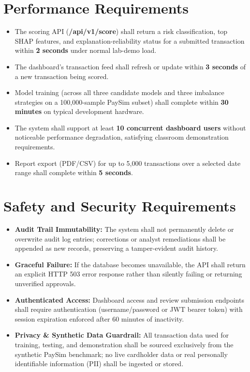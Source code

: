 \documentclass[12pt, a4paper]{report}
\begin{document}
\section{Performance Requirements}
\begin{itemize}
    \item[\textbf{NFR-1}] The scoring API (\textbf{/api/v1/score}) shall return a risk classification, top SHAP features, and explanation-reliability status for a submitted transaction within \textbf{2 seconds} under normal lab-demo load.
    \item[\textbf{NFR-2}] The dashboard's transaction feed shall refresh or update within \textbf{3 seconds} of a new transaction being scored.
    \item[\textbf{NFR-3}] Model training (across all three candidate models and three imbalance strategies on a 100,000-sample PaySim subset) shall complete within \textbf{30 minutes} on typical development hardware.
    \item[\textbf{NFR-4}] The system shall support at least \textbf{10 concurrent dashboard users} without noticeable performance degradation, satisfying classroom demonstration requirements.
    \item[\textbf{NFR-5}] Report export (PDF/CSV) for up to 5,000 transactions over a selected date range shall complete within \textbf{5 seconds}.
\end{itemize}

\section{Safety and Security Requirements}
\begin{itemize}
    \item[\textbf{NFR-6}] \textbf{Audit Trail Immutability:} The system shall not permanently delete or overwrite audit log entries; corrections or analyst remediations shall be appended as new records, preserving a tamper-evident audit history.
    \item[\textbf{NFR-7}] \textbf{Graceful Failure:} If the database becomes unavailable, the API shall return an explicit HTTP 503 error response rather than silently failing or returning unverified approvals.
    \item[\textbf{NFR-8}] \textbf{Authenticated Access:} Dashboard access and review submission endpoints shall require authentication (username/password or JWT bearer token) with session expiration enforced after 60 minutes of inactivity.
    \item[\textbf{NFR-9}] \textbf{Privacy \& Synthetic Data Guardrail:} All transaction data used for training, testing, and demonstration shall be sourced exclusively from the synthetic PaySim benchmark; no live cardholder data or real personally identifiable information (PII) shall be ingested or stored.
\end{itemize}
\end{document}
